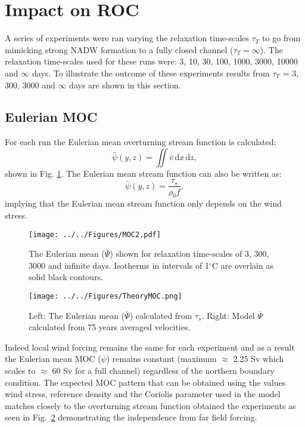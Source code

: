 % 
\section{Impact on ROC}
A series of experiments were ran varying the relaxation time-scales $\tau_T$ to go from mimicking strong NADW formation to a fully closed channel ($\tau_T = \infty$). The relaxation time-scales used for these runs were: 3, 10, 30, 100, 1000, 3000, 10000 and $\infty$ days. To illustrate the outcome of these experiments results from $\tau_T$ = 3, 300, 3000 and $\infty$ days are shown in this section.
\subsection{Eulerian MOC}
For each run the Eulerian  mean overturning stream function is calculated:
\begin{equation}
\bar{\psi}(y, z)=\iint \overline{v}\, \mathrm{d}x\, \mathrm{d}z,
\end{equation}
shown in Fig. \ref{fig:MOC}. The Eulerian mean stream function can also be written as:
\begin{equation}
\bar{\psi}(y, z)= \frac{\tau _s}{\rho _0 f},
\label{EQ:psimean}
\end{equation}
implying that the Eulerian mean stream function only depends on the wind stress. 
\begin{figure}[t]
\noindent \texttt{[image: ../../Figures/MOC2.pdf]}
\caption{The Eulerian mean ($\overline{\Psi}$) shown for relaxation time-scales of 3, 300, 3000 and infinite days. Isotherms in intervals of 1$^{\circ}$C are overlain as solid black contours.}
\label{fig:MOC}
\end{figure}
\begin{figure}[t]
\noindent \texttt{[image: ../../Figures/TheoryMOC.png]}
\caption{Left: The Eulerian mean ($\overline{\Psi}$) calculated from $\tau _s$. Right: Model $\overline{\Psi}$ calculated from 75 years averaged velocities. }
\label{fig:TMOC}
\end{figure}
Indeed local wind forcing remains the same for each experiment and as a result the Eulerian mean MOC ($\overline{\psi}$) remains constant (maximum $\approx$ 2.25 Sv which scales to $\approx$ 60 Sv for a full channel) regardless of the northern boundary condition. The expected MOC pattern that can be obtained using the values wind stress, reference density and the Coriolis parameter used in the model matches closely to the overturning stream function obtained the experiments as seen in Fig.~\ref{fig:TMOC}  demonstrating the independence from far field forcing.
